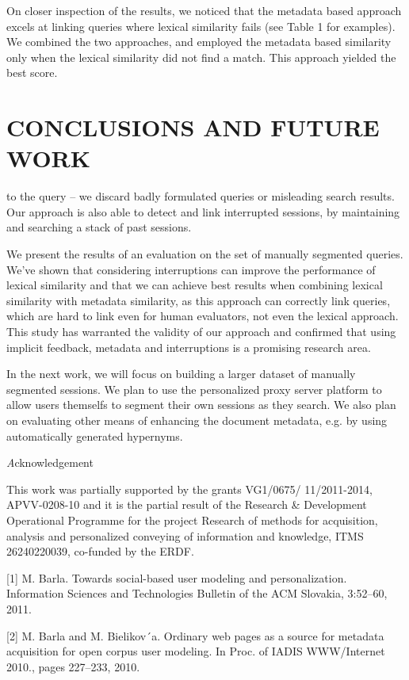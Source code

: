 \documentclass{acm_proc_article-sp} %
\begin{document}
On closer inspection of the results, we noticed that the metadata
based approach excels at linking queries where lexical
similarity fails (see Table 1 for examples). We combined the
two approaches, and employed the metadata based similarity
only when the lexical similarity did not find a match.
This approach yielded the best score.

\section{CONCLUSIONS AND FUTURE WORK}

to the query – we discard badly formulated queries or misleading
search results. Our approach is also able to detect
and link interrupted sessions, by maintaining and searching
a stack of past sessions.

We present the results of an evaluation on the set of manually
segmented queries. We’ve shown that considering interruptions
can improve the performance of lexical similarity
and that we can achieve best results when combining lexical
similarity with metadata similarity, as this approach can
correctly link queries, which are hard to link even for human
evaluators, not even the lexical approach. This study
has warranted the validity of our approach and confirmed
that using implicit feedback, metadata and interruptions is
a promising research area.

In the next work, we will focus on building a larger dataset
of manually segmented sessions. We plan to use the personalized
proxy server platform to allow users themselfs to
segment their own sessions as they search. We also plan on
evaluating other means of enhancing the document metadata,
e.g. by using automatically generated hypernyms.

\textit Acknowledgement

This work was partially supported by the grants VG1/0675/
11/2011-2014, APVV-0208-10 and it is the partial result of
the Research & Development Operational Programme for
the project Research of methods for acquisition, analysis
and personalized conveying of information and knowledge,
ITMS 26240220039, co-funded by the ERDF.




[1] M. Barla. Towards social-based user modeling and
personalization. Information Sciences and
Technologies Bulletin of the ACM Slovakia, 3:52–60,
2011.

[2] M. Barla and M. Bielikov´a. Ordinary web pages as a
source for metadata acquisition for open corpus user
modeling. In Proc. of IADIS WWW/Internet 2010.,
pages 227–233, 2010.
\end{document}
